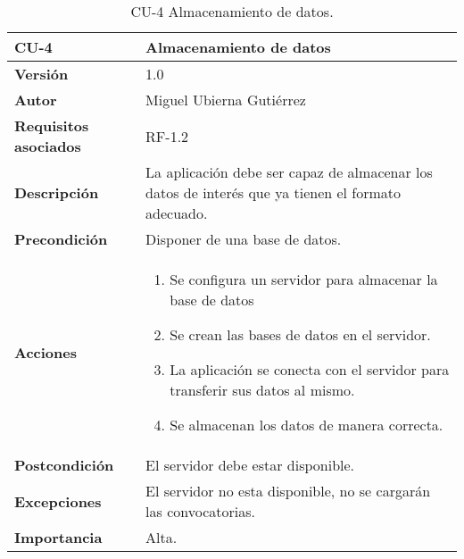 \begin{table}[p]
	\centering
	\begin{tabularx}{\linewidth}{ p{} p{} }
		\toprule
		\textbf{CU-4}    & \textbf{Almacenamiento de datos}\\
		\toprule
		\textbf{Versión}              & 1.0    \\
		\textbf{Autor}                & Miguel Ubierna Gutiérrez \\
		\textbf{Requisitos asociados} & RF-1.2 \\
		\textbf{Descripción}          & La aplicación debe ser capaz de almacenar los datos de interés que ya tienen el formato adecuado. \\
		\textbf{Precondición}         & Disponer de una base de datos.\\
		\textbf{Acciones}             &
		\begin{enumerate}
			\def\labelenumi{\arabic{enumi}.}
			\tightlist
			\item Se configura un servidor para almacenar la base de datos
			\item Se crean las bases de datos en el servidor.
                \item La aplicación se conecta con el servidor para transferir sus datos al mismo.
                \item Se almacenan los datos de manera correcta.
		\end{enumerate}\\
		\textbf{Postcondición}        & El servidor debe estar disponible. \\
		\textbf{Excepciones}          & El servidor no esta disponible, no se cargarán las convocatorias.  \\
		\textbf{Importancia}          & Alta.  \\
		\bottomrule
	\end{tabularx}
	\caption{CU-4 Almacenamiento de datos.}
\end{table}


